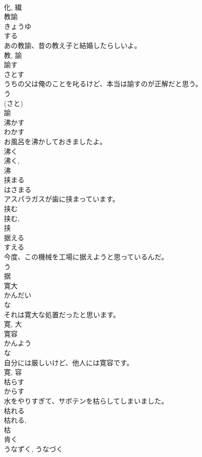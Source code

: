 \documentclass[8pt]{extreport}
\begin{document}
\begin{CJK}{UTF8}{min}
\\	化, 繊	
\\	教諭	
\\	きょうゆ	
\\	する 
\\	あの教諭、昔の教え子と結婚したらしいよ。	
\\	教, 諭	
\\	諭す	
\\	さとす	
\\	うちの父は俺のことを叱るけど、本当は諭すのが正解だと思う。	
\\	う 
\\	(さと) 
\\	諭	
\\	沸かす	
\\	わかす	
\\	お風呂を沸かしておきましたよ。	
\\	沸く 
\\	沸く, 
\\	沸	
\\	挟まる	
\\	はさまる	
\\	アスパラガスが歯に挟まっています。	
\\	挟む 
\\	挟む, 
\\	挟	
\\	据える	
\\	すえる	
\\	今度、この機械を工場に据えようと思っているんだ。	
\\	う 
\\	据	
\\	寛大	
\\	かんだい	
\\	な 
\\	それは寛大な処置だったと思います。	
\\	寛, 大	
\\	寛容	
\\	かんよう	
\\	な 
\\	自分には厳しいけど、他人には寛容です。	
\\	寛, 容	
\\	枯らす	
\\	からす	
\\	水をやりすぎて、サボテンを枯らしてしまいました。	
\\	枯れる 
\\	枯れる, 
\\	枯	
\\	肯く	
\\	うなずく, うなづく	

\end{CJK}
\end{document}
